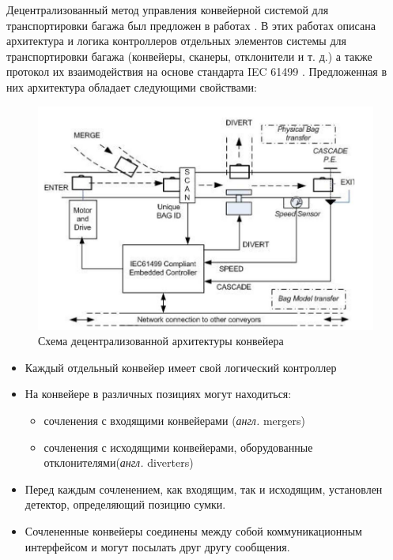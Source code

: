 \documentclass[specification,annotation,times]{itmo-student-thesis}
\theoremstyle{definition}
\begin{document}
Децентрализованный метод управления конвейерной системой для транспортировки
багажа был предложен в работах \cite{black2009intelligent, vyatkin-controllers}.
В этих работах описана архитектура и логика контроллеров отдельных элементов
системы для транспортировки багажа (конвейеры, сканеры, отклонители и т. д.) а
также протокол их взаимодействия на основе стандарта IEC 61499 \cite{IEC61499}.
Предложенная в них архитектура обладает следующими свойствами:

\begin{figure}[!h]
  \caption{Схема децентрализованной архитектуры конвейера}\label{vyatkin-convs}
  \centering
  \includegraphics[width=\textwidth]{vyatkin-conveyors-illustration}
\end{figure}

\begin{itemize}
\item Каждый отдельный конвейер имеет свой логический контроллер
\item На конвейере в различных позициях могут находиться:
  \begin{itemize}
  \item сочленения с входящими конвейерами (\textit{англ.} mergers)
  \item сочленения с исходящими конвейерами, оборудованные отклонителями(\textit{англ.} diverters)
  \end{itemize} 
\item Перед каждым сочленением, как входящим, так и исходящим, установлен
  детектор, определяющий позицию сумки.
\item Сочлененные конвейеры соединены между собой коммуникационным интерфейсом и
  могут посылать друг другу сообщения.
\end{itemize}
\end{document}
